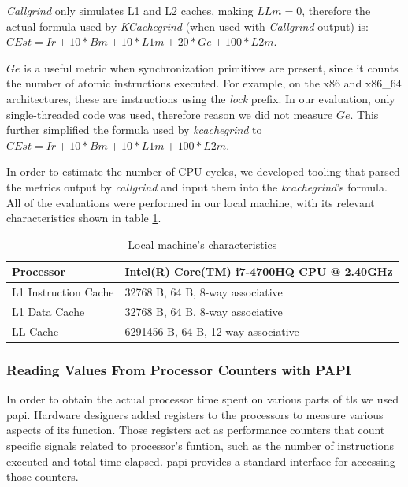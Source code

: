 \textit{Callgrind} only simulates L1 and L2 caches, making $LLm=0$, therefore the actual formula
used by \textit{KCachegrind} (when used with \textit{Callgrind} output) is:
$CEst = Ir + 10*Bm + 10*L1m + 20*Ge + 100*L2m$.

$Ge$ is a useful metric when synchronization primitives are present, since it counts the number of
atomic instructions executed. For example, on the x86 and x86\_64 architectures, these are
instructions using the \textit{lock} prefix. In our evaluation, only single-threaded code was used, therefore
reason we did not measure $Ge$. This further simplified the formula used by \textit{kcachegrind} to
$CEst = Ir + 10*Bm + 10*L1m + 100*L2m$.

In order to estimate the number of CPU cycles, we developed tooling that parsed the metrics output by
\textit{callgrind} and input them into the \textit{kcachegrind}'s formula. All of the evaluations were performed in
our local machine, with its relevant characteristics shown in table \ref{table:local-machine}.

\begin{table}[]
\begin{tabular}{|l|l|}
\hline
Processor            & Intel(R) Core(TM) i7-4700HQ CPU @ 2.40GHz \\ \hline
L1 Instruction Cache & 32768 B, 64 B, 8-way associative          \\ \hline
L1 Data Cache        & 32768 B, 64 B, 8-way associative          \\ \hline
LL Cache             & 6291456 B, 64 B, 12-way associative       \\ \hline
\end{tabular}
\centering \caption{\label{table:local-machine} Local machine's characteristics}
\end{table}

\subsubsection{Reading Values From Processor Counters with PAPI}

In order to obtain the actual processor time spent on various parts of \gls{tls} 
we used \gls{papi}. Hardware designers added registers to the processors to measure various 
aspects of its function. Those registers act as performance counters that count specific
signals related to processor's funtion, such as the number of instructions executed and total
time elapsed. \gls{papi} provides a standard interface for accessing those counters.

